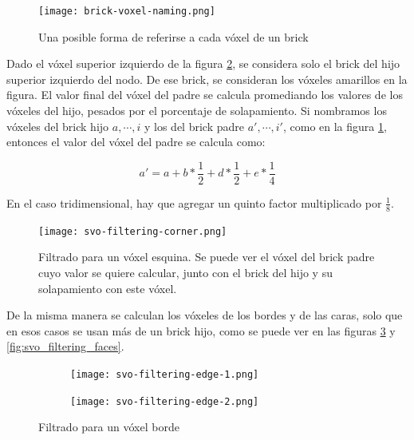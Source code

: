 
\begin{figure}
    \centering
    \texttt{[image: brick-voxel-naming.png]}
    \caption{Una posible forma de referirse a cada vóxel de un brick}
    \label{fig:brick-voxel-naming}
\end{figure}

Dado el vóxel superior izquierdo de la figura \ref{fig:svo_filtering_corners}, se considera solo el brick del hijo superior izquierdo del nodo.
De ese brick, se consideran los vóxeles amarillos en la figura.
El valor final del vóxel del padre se calcula promediando los valores de los vóxeles del hijo, pesados por el porcentaje de solapamiento.
Si nombramos los vóxeles del brick hijo $a, \cdots, i$ y los del brick padre $a', \cdots, i'$, como en la figura \ref{fig:brick-voxel-naming}, entonces el valor del vóxel del padre se calcula como:

$$
a' = a + b * \frac{1}{2} + d * \frac{1}{2} + e * \frac{1}{4}
$$

En el caso tridimensional, hay que agregar un quinto factor multiplicado por $\frac{1}{8}$.


\begin{figure}
    \centering
    \texttt{[image: svo-filtering-corner.png]}
    \caption{
        Filtrado para un vóxel esquina.
        Se puede ver el vóxel del brick padre cuyo valor se quiere calcular, junto con el brick del hijo y su solapamiento con este vóxel.
    }
    \label{fig:svo_filtering_corners}
\end{figure}

De la misma manera se calculan los vóxeles de los bordes y de las caras, solo que en esos casos se usan más de un brick hijo, como se puede ver en las figuras \ref{fig:svo_filtering_edges} y \ref{fig:svo_filtering_faces}.

\begin{figure}
    \begin{center}
        \begin{subfigure}{.24\textwidth}
            \texttt{[image: svo-filtering-edge-1.png]}
        \end{subfigure}
        \begin{subfigure}{.24\textwidth}
            \texttt{[image: svo-filtering-edge-2.png]}
        \end{subfigure}
    \end{center}
    \caption{Filtrado para un vóxel borde}
    \label{fig:svo_filtering_edges}
\end{figure}


